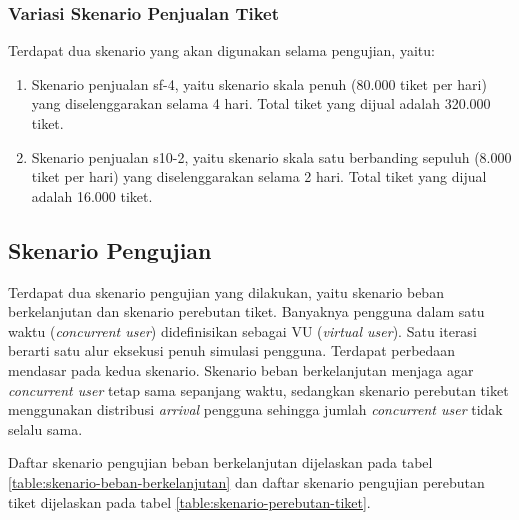 \subsubsection{Variasi Skenario Penjualan Tiket}

Terdapat dua skenario yang akan digunakan selama pengujian, yaitu:

\begin{enumerate}
    \item Skenario penjualan sf-4, yaitu skenario skala penuh (80.000 tiket per hari) yang diselenggarakan selama 4 hari. Total tiket yang dijual adalah 320.000 tiket.
    \item Skenario penjualan s10-2, yaitu skenario skala satu berbanding sepuluh (8.000 tiket per hari) yang diselenggarakan selama 2 hari. Total tiket yang dijual adalah 16.000 tiket.
\end{enumerate}

\subsection{Skenario Pengujian}

Terdapat dua skenario pengujian yang dilakukan, yaitu skenario beban berkelanjutan dan skenario perebutan tiket. Banyaknya pengguna dalam satu waktu (\textit{concurrent user}) didefinisikan sebagai VU (\textit{virtual user}). Satu iterasi berarti satu alur eksekusi penuh simulasi pengguna. Terdapat perbedaan mendasar pada kedua skenario. Skenario beban berkelanjutan menjaga agar \textit{concurrent user} tetap sama sepanjang waktu, sedangkan skenario perebutan tiket menggunakan distribusi \textit{arrival} pengguna sehingga jumlah \textit{concurrent user} tidak selalu sama.

Daftar skenario pengujian beban berkelanjutan dijelaskan pada tabel \ref{table:skenario-beban-berkelanjutan} dan daftar skenario pengujian perebutan tiket dijelaskan pada tabel \ref{table:skenario-perebutan-tiket}.

